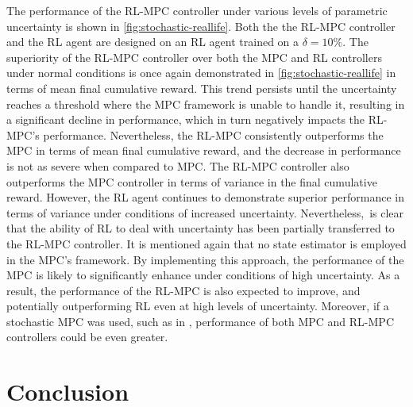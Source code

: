 The performance of the RL-MPC controller under various levels of parametric uncertainty is shown in \autoref{fig:stochastic-reallife}. Both the the RL-MPC controller and the RL agent are designed on an RL agent trained on a $\delta = 10\%$. The superiority of the RL-MPC controller over both the MPC and RL controllers under normal conditions is once again demonstrated in \autoref{fig:stochastic-reallife} in terms of mean final cumulative reward. This trend persists  until the uncertainty reaches a threshold where the MPC framework is unable to handle it, resulting in a significant decline in performance, which in turn negatively impacts the RL-MPC's performance. Nevertheless, the RL-MPC consistently outperforms the MPC in terms of mean final cumulative reward, and the decrease in performance is not as severe when compared to MPC. The RL-MPC controller also outperforms the MPC controller in terms of variance in the final cumulative reward. However, the RL agent continues to demonstrate superior performance in terms of variance under conditions of increased uncertainty. Nevertheless, is clear that the ability of RL to deal with uncertainty has been partially transferred to the RL-MPC controller. It is mentioned again that no state estimator is employed in the MPC's framework. By implementing this approach, the performance of the MPC is likely to significantly enhance under conditions of high uncertainty. As a result, the performance of the RL-MPC is also expected to improve, and potentially outperforming RL even at high levels of uncertainty. Moreover, if a stochastic MPC was used, such as in \cite{boersmaRobustSamplebasedModel2022}, performance of both MPC and RL-MPC controllers could be even greater. 


\section{Conclusion}

